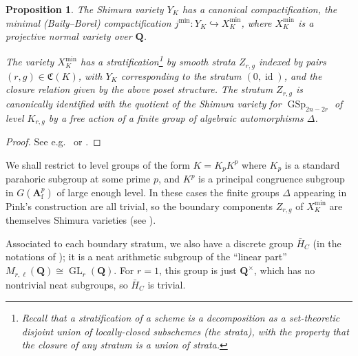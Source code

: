 \documentclass[cjm]{ipart}
\theoremstyle{plain}
\newtheorem{proposition}[theorem]{Proposition}
\theoremstyle{remark}
\DeclareMathOperator{\GL}{GL}
\DeclareMathOperator{\GSp}{GSp}
\DeclareMathOperator{\id}{id}
\newcommand{\Af}{\AA_{\mathrm{f}}}
\newcommand{\QQ}{\mathbf{Q}}
\newcommand{\into}{\hookrightarrow}
\renewcommand{\AA}{\mathbf{A}}
\numberwithin{equation}{subsection}
\begin{document}
  \begin{proposition}
   The Shimura variety $Y_K$ has a canonical compactification, the \emph{minimal (Baily--Borel) compactification} $j^{\min}: Y_K \into X^{\min}_K$, where $X^{\min}_K$ is a projective normal variety over $\QQ$.

   The variety $X^{\min}_K$ has a stratification\footnote{Recall that a stratification of a scheme is a decomposition as a set-theoretic disjoint union of locally-closed subschemes (the strata), with the property that the closure of any stratum is a union of strata.} by smooth strata $Z_{r, g}$ indexed by pairs $(r, g) \in \mathfrak{C}(K)$, with $Y_K$ corresponding to the stratum $(0, \id)$, and the closure relation given by the above poset structure. The stratum $Z_{r, g}$ is canonically identified with the quotient of the Shimura variety for $\GSp_{2n-2r}$ of level $K_{r, g}$ by a free action of a finite group of algebraic automorphisms $\Delta$.
  \end{proposition}

  \begin{proof}
   See e.g.~\cite[\S 3]{pink92} or \cite[\S 1]{burgoswildeshaus04}.
  \end{proof}

  \begin{remark}
   We shall restrict to level groups of the form $K = K_p K^p$ where $K_p$ is a standard parahoric subgroup at some prime $p$, and $K^p$ is a principal congruence subgroup in $G(\Af^p)$ of large enough level. In these cases the finite groups $\Delta$ appearing in Pink's construction are all trivial, so the boundary components $Z_{r, g}$ of $X_K^{\min}$ are themselves Shimura varieties (see \cite{stroh10-minimal}).
  \end{remark}

  Associated to each boundary stratum, we also have a discrete group $\bar{H}_C$ (in the notations of \cite{burgoswildeshaus04}); it is a neat arithmetic subgroup of the ``linear part'' $M_{r, \ell}(\QQ) \cong \GL_r(\QQ)$. For $r = 1$, this group is just $\QQ^\times$, which has no nontrivial neat subgroups, so  $\bar{H}_C$ is trivial.
%
\end{document}
